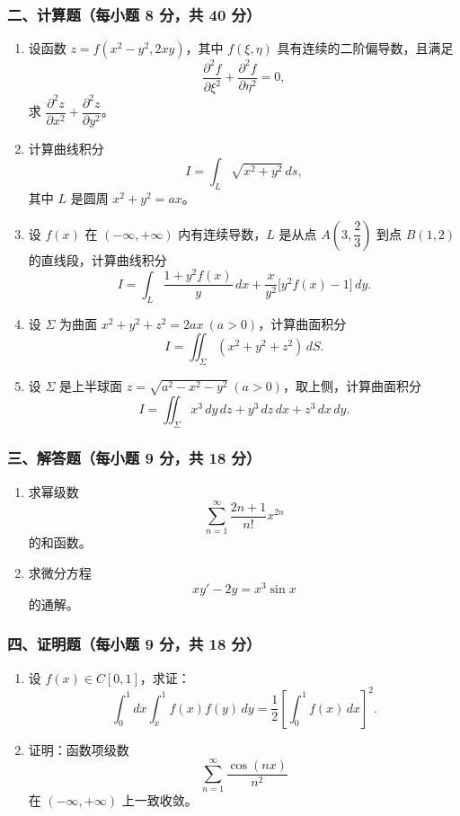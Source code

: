 \subsubsection*{二、计算题（每小题 8 分，共 40 分）}
\begin{enumerate}
  \item 设函数 $z=f(x^2-y^2,2xy)$，其中 $f(\xi,\eta)$ 具有连续的二阶偏导数，且满足
  \[
  \frac{\partial^2 f}{\partial \xi^2}+\frac{\partial^2 f}{\partial \eta^2}=0,
  \]
  求 $\dfrac{\partial^2 z}{\partial x^2}+\dfrac{\partial^2 z}{\partial y^2}$。
  \item 计算曲线积分
  \[
  I=\int_L\sqrt{x^2+y^2}\,ds,
  \]
  其中 $L$ 是圆周 $x^2+y^2=ax$。
  \item 设 $f(x)$ 在 $(-\infty,+\infty)$ 内有连续导数，$L$ 是从点 $A\!\left(3,\dfrac23\right)$ 到点 $B(1,2)$ 的直线段，计算曲线积分
  \[
  I=\int_L\frac{1+y^2f(x)}{y}\,dx+\frac{x}{y^2}\bigl[y^2f(x)-1\bigr]\,dy.
  \]
  \item 设 $\Sigma$ 为曲面 $x^2+y^2+z^2=2ax\ (a>0)$，计算曲面积分
  \[
  I=\iint_\Sigma (x^2+y^2+z^2)\,dS.
  \]
  \item 设 $\Sigma$ 是上半球面 $z=\sqrt{a^2-x^2-y^2}\ (a>0)$，取上侧，计算曲面积分
  \[
  I=\iint_\Sigma x^3\,dy\,dz+y^3\,dz\,dx+z^3\,dx\,dy.
  \]
\end{enumerate}

\subsubsection*{三、解答题（每小题 9 分，共 18 分）}
\begin{enumerate}
  \item 求幂级数
  \[
  \sum_{n=1}^{\infty}\frac{2n+1}{n!}x^{2n}
  \]
  的和函数。
  \item 求微分方程
  \[
  xy'-2y=x^3\sin x
  \]
  的通解。
\end{enumerate}

\subsubsection*{四、证明题（每小题 9 分，共 18 分）}
\begin{enumerate}
  \item 设 $f(x)\in C[0,1]$，求证：
  \[
  \int_0^1 dx\int_x^1 f(x)f(y)\,dy=\frac12\left[\int_0^1 f(x)\,dx\right]^2.
  \]
  \item 证明：函数项级数
  \[
  \sum_{n=1}^{\infty}\frac{\cos(nx)}{n^2}
  \]
  在 $(-\infty,+\infty)$ 上一致收敛。
\end{enumerate}

